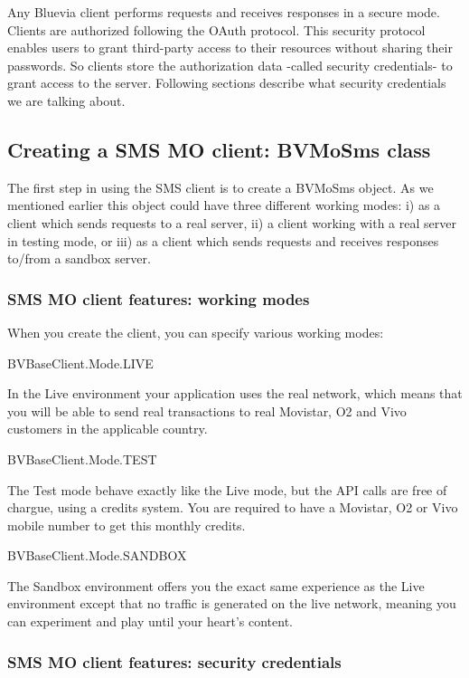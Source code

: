 Any Bluevia client performs requests and receives responses in a secure mode. Clients are authorized following the OAuth protocol. This security protocol enables users to grant third-\/party access to their resources without sharing their passwords. So clients store the authorization data -\/called security credentials-\/ to grant access to the server. Following sections describe what security credentials we are talking about.\hypertarget{blv_sms_mo_guide_creating_a_sms_mo_client_sec}{}\subsection{Creating a SMS MO client: BVMoSms class}\label{blv_sms_mo_guide_creating_a_sms_mo_client_sec}
The first step in using the SMS client is to create a BVMoSms object. As we mentioned earlier this object could have three different working modes: i) as a client which sends requests to a real server, ii) a client working with a real server in testing mode, or iii) as a client which sends requests and receives responses to/from a sandbox server.\hypertarget{blv_sms_mo_guide_sms_mo_client_features_working_modes_sec}{}\subsubsection{SMS MO client features: working modes}\label{blv_sms_mo_guide_sms_mo_client_features_working_modes_sec}
When you create the client, you can specify various working modes: 
\begin{DoxyItemize}
\item BVBaseClient.Mode.LIVE \par
In the Live environment your application uses the real network, which means that you will be able to send real transactions to real Movistar, O2 and Vivo customers in the applicable country.


\item BVBaseClient.Mode.TEST \par
The Test mode behave exactly like the Live mode, but the API calls are free of chargue, using a credits system. You are required to have a Movistar, O2 or Vivo mobile number to get this monthly credits.


\item BVBaseClient.Mode.SANDBOX \par
The Sandbox environment offers you the exact same experience as the Live environment except that no traffic is generated on the live network, meaning you can experiment and play until your heart’s content. 
\end{DoxyItemize}\hypertarget{blv_sms_mo_guide_sms_mo_client_features_security_credentials}{}\subsubsection{SMS MO client features: security credentials}\label{blv_sms_mo_guide_sms_mo_client_features_security_credentials}
